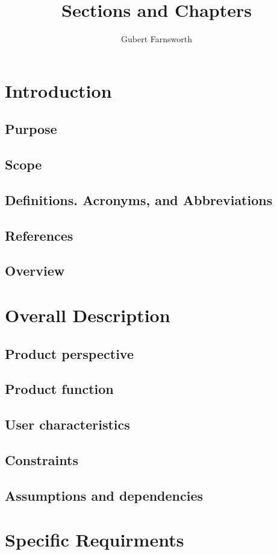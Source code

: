 \documentclass{article}
\title{Sections and Chapters}
\author{Gubert Farnsworth}
\date{ }
\begin{document}
  
\maketitle
  
\tableofcontents

\section{Introduction}
   
\subsection{Purpose}
\subsection{Scope}
\subsection{Definitions. Acronyms, and Abbreviations}
\subsection{References}
\subsection{Overview}

\section{Overall Description}
\subsection{Product perspective}
\subsection{Product function}
\subsection{User characteristics}
\subsection{Constraints}
\subsection{Assumptions and dependencies}

\section{Specific Requirments}
\end{document}
